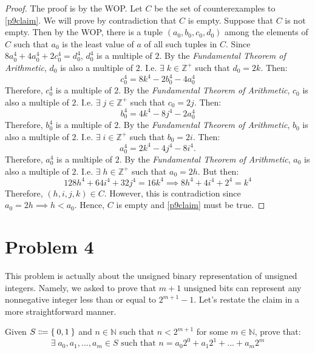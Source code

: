 \documentclass{article}
\begin{document}
\begin{proof}
	The proof is by the WOP. Let $C$ be the set of counterexamples to \eqref{p9claim}. We will prove by contradiction that $C$ is empty. Suppose that $C$ is not empty. Then by the WOP, there is a tuple $(a_0, b_0, c_0, d_0)$ among the elements of $C$ such that $a_0$ is the least value of $a$ of all such tuples in $C$. Since $8a_0^4 + 4a_0^4 + 2c_0^4 = d_0^4$, $d_0^4$ is a multiple of $2$. By the \textit{Fundamental Theorem of Arithmetic}, $d_0$ is also a multiple of $2$. I.e. $\exists \; k \in \mathbb{Z^+}$ such that $d_0 = 2k$. Then:
	\[
		c_0^4 = 8k^4 - 2b_0^4 - 4a_0^4
	\]
	Therefore, $c_0^4$ is a multiple of $2$. By the \textit{Fundamental Theorem of Arithmetic}, $c_0$ is also a multiple of $2$. I.e. $\exists \; j \in \mathbb{Z^+}$ such that $c_0 = 2j$. Then:
	\[
		b_0^4 = 4k^4 - 8j^4 - 2a_0^4
	\]
	Therefore, $b_0^4$ is a multiple of $2$. By the \textit{Fundamental Theorem of Arithmetic}, $b_0$ is also a multiple of $2$. I.e. $\exists \; i \in \mathbb{Z^+}$ such that $b_0 = 2i$. Then:
	\[
		a_0^4 = 2k^4 - 4j^4 - 8i^4.
	\]
	Therefore, $a_0^4$ is a multiple of $2$. By the \textit{Fundamental Theorem of Arithmetic}, $a_0$ is also a multiple of $2$. I.e. $\exists \; h \in \mathbb{Z^+}$ such that $a_0 = 2h$. But then:
	\[
		128h^4 + 64i^4 + 32j^4 = 16k^4 \implies 8h^4 + 4i^4 + 2^4 = k^4
	\]
	Therefore, $(h, i, j, k) \in C$. However, this is contradiction since $a_0 = 2h \implies h < a_0$. Hence, $C$ is empty and \eqref{p9claim} must be true.

\end{proof}

\pagebreak

\section{Problem 4}
This problem is actually about the unsigned binary representation of unsigned integers. Namely, we asked to prove that $m + 1$ unsigned bits can represent any nonnegative integer less than or equal to $2^{m + 1} - 1$. Let's restate the claim in a more straightforward manner.

Given $S \Coloneqq \Set{0, 1}$ and $n \in \mathbb{N}$ such that $n < 2^{m + 1}$ for some $m \in \mathbb{N}$, prove that:
\begin{equation}\label{p6claim}
	\exists \; a_0, a_1, ..., a_m \in S \text{ such that } n = a_0 2^0 + a_1 2^1 + ... + a_m 2^m
\end{equation}
\end{document}
